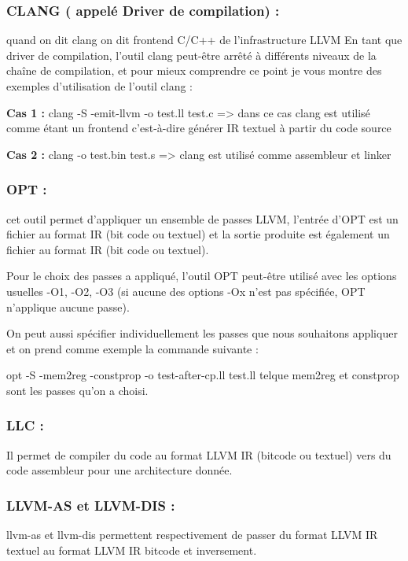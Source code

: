 \documentclass[12pt,titlepage]{article}
\begin{document}
   \subsubsection{ CLANG ( appelé Driver de compilation) :} quand on dit clang on dit frontend C/C++ de l’infrastructure LLVM
En tant que driver de compilation, l’outil clang peut-être arrêté à différents niveaux de la chaîne de compilation, et pour mieux comprendre ce point je vous montre des exemples d’utilisation de l’outil clang :
      
	\textbf{Cas 1 : } clang -S -emit-llvm -o test.ll test.c => dans ce cas clang est utilisé comme étant un frontend c'est-à-dire générer IR textuel à partir du code source 
      
    \textbf{Cas 2 : }clang -o test.bin test.s => clang est utilisé comme assembleur et linker 
      
      
    \subsubsection{ OPT :} cet outil permet d’appliquer un ensemble de passes LLVM, l’entrée d'OPT est un fichier au format IR (bit code ou textuel) et la sortie produite est également un fichier au format IR (bit code ou textuel).
      
Pour le choix des passes a appliqué, l’outil OPT peut-être utilisé avec les options usuelles -O1, -O2, -O3 (si aucune des options -Ox n’est pas spécifiée, OPT n’applique aucune passe).
      
      On peut aussi spécifier individuellement les passes que nous souhaitons appliquer et on prend comme exemple la commande suivante  :
      
      opt -S -mem2reg -constprop -o test-after-cp.ll test.ll
      telque mem2reg  et constprop  sont les passes qu’on a choisi.

    \subsubsection{ LLC :} Il permet de compiler du code au format LLVM IR (bitcode ou textuel) vers du code assembleur pour une architecture donnée. 
      
    \subsubsection{LLVM-AS et LLVM-DIS : } 
    
    llvm-as et llvm-dis permettent respectivement de passer du format LLVM IR textuel au format LLVM IR bitcode et inversement.
\end{document}

